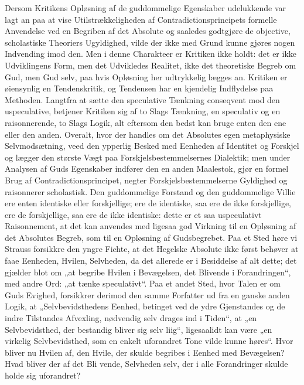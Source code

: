 \documentclass[12pt]{book}
\begin{document}
Dersom Kritikens Opløsning af de guddommelige Egenskaber udelukkende
var lagt an paa at vise Utilstrækkeligheden af
Contradictionsprincipets formelle Anvendelse ved en Begriben af det
Absolute og saaledes godtgjøre de objective, scholastiske Theoriers
Ugyldighed, vilde der ikke med Grund kunne gjøres nogen Indvending
imod den. Men i denne Charakteer er Kritiken ikke holdt: det er ikke
Udviklingens Form, men det Udvikledes Realitet, ikke det theoretiske
Begreb om Gud, men Gud selv, paa hvis Opløsning her udtrykkelig
lægges an.
Kritiken er øiensynlig en Tendenskritik, og Tendensen har en
kjendelig Indflydelse paa Methoden. Langtfra at sætte den
speculative Tænkning conseqvent mod den uspeculative, betjener
Kritiken sig af to Slags Tænkning, en speculativ og en
raisonnerende, to Slags Logik, alt eftersom den bedst kan bruge
enten den ene eller den anden. Overalt, hvor der handles om det
Absolutes egen metaphysiske Selvmodsætning, veed den ypperlig
Besked med Eenheden af Identitet og Forskjel og lægger den største
Vægt paa Forskjelsbestemmelsernes Dialektik; men under Analysen af
Guds Egenskaber indfører den en anden Maalestok, gjør en formel
Brug af Contradictionsprincipet, negter Forskjelsbestemmelserne
Gyldighed og raisonnerer scholastisk. Den guddommelige Forstand og
den guddommelige Villie ere enten identiske eller forskjellige; ere
de identiske, saa ere de ikke forskjellige, ere de forskjellige, saa
ere de ikke identiske: dette er et saa uspeculativt Raisonnement, at
det kan anvendes med ligesaa god Virkning til en Opløsning af det
Absolutes Begreb, som til en Opløsning af Gudsbegrebet. Paa et Sted
høre vi Strauss forsikkre den yngre Fichte, at det Hegelske Absolute
ikke først behøver at faae Eenheden, Hvilen, Selvheden, da det
allerede er i Besiddelse af alt dette; det gjælder blot om „at
begribe Hvilen i Bevægelsen, det Blivende i Forandringen“, med andre
Ord: „at tænke speculativt“. Paa et andet Sted, hvor Talen er om
Guds Evighed, forsikkrer derimod den samme Forfatter ud fra en
ganske anden Logik, at „Selvbevidsthedens Eenhed, betinget ved de
ydre Gjenstandes og de indre Tilstandes Afvexling, nødvendig selv
drages ind i Tiden“, at „en Selvbevidsthed, der bestandig bliver sig
selv liig“, ligesaalidt kan være „en virkelig Selvbevidsthed, som en
enkelt uforandret Tone vilde kunne høres“. Hvor bliver nu Hvilen af,
den Hvile, der skulde begribes i Eenhed med Bevægelsen? Hvad bliver
der af det Bli\-
vende, Selvheden selv, der i alle Forandringer skulde holde sig
uforandret?
\end{document}
